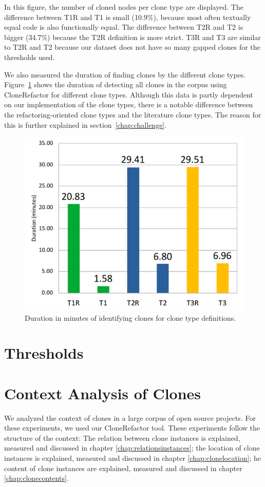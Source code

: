 In this figure, the number of cloned nodes per clone type are displayed. The difference between T1R and T1 is small (10.9\%), because most often textually equal code is also functionally equal. The difference between T2R and T2 is bigger (34.7\%) because the T2R definition is more strict. T3R and T3 are similar to T2R and T2 because our dataset does not have so many gapped clones for the thresholds used.

We also measured the duration of finding clones by the different clone types. Figure~\ref{fig:performance} shows the duration of detecting all clones in the corpus using CloneRefactor for different clone types. Although this data is partly dependent on our implementation of the clone types, there is a notable difference between the refactoring-oriented clone types and the literature clone types. The reason for this is further explained in section~\ref{chap:challenge}.

\begin{figure}[H]
  \centering
    \includegraphics[width=.5\columnwidth]{img/DurationChart}
    \caption{Duration in minutes of identifying clones for clone type definitions.}
  \label{fig:performance}
\end{figure}

\section{Thresholds} \label{sec:thresholds}

\section{Context Analysis of Clones}\label{chap:clonecontextexpl}
We analyzed the context of clones in a large corpus of open source projects. For these experiments, we used our CloneRefactor tool. These experiments follow the structure of the context: The relation between clone instances is explained, measured and discussed in chapter \ref{chap:relationsinstances}; the location of clone instances is explained, measured and discussed in chapter \ref{chap:clonelocation};  he content of clone instances are explained, measured and discussed in chapter \ref{chap:clonecontents}.

